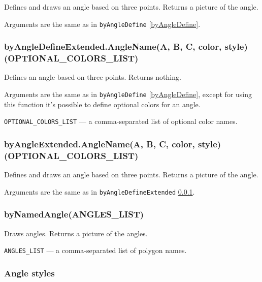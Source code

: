 \documentclass{ltxdoc}
\begin{document}
	Defines and draws an angle based on three points. Returns a picture of the angle.
	
	Arguments are the same as in \texttt{byAngleDefine} \ref{byAngleDefine}.

\subsubsection{byAngleDefineExtended.AngleName(A, B, C, color, style)(OPTIONAL\_COLORS\_LIST)}\label{byAngleDefineExtended}

	Defines an angle based on three points. Returns nothing.
	
	Arguments are the same as in \texttt{byAngleDefine} \ref{byAngleDefine}, except for using this function it's possible to define optional colors for an angle.
	
	\texttt{OPTIONAL\_COLORS\_LIST} — a comma-separated list of optional color names.
	
\subsubsection{byAngleExtended.AngleName(A, B, C, color, style)(OPTIONAL\_COLORS\_LIST)}\label{byAngleExtended}

	Defines and draws an angle based on three points. Returns a picture of the angle.
	
	Arguments are the same as in \texttt{byAngleDefineExtended} \ref{byAngleDefineExtended}.

\subsubsection{byNamedAngle(ANGLES\_LIST)}\label{byNamedAngle}
	
	Draws angles. Returns a picture of the angles.
	
	\texttt{ANGLES\_LIST} — a comma-separated list of polygon names.


\subsubsection{Angle styles}\label{AngleStyles}
\end{document}
